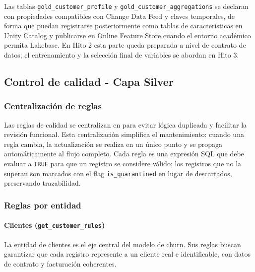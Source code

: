 \documentclass[12pt,a4paper]{article}
\begin{document}
Las tablas \texttt{gold\_customer\_profile} y \texttt{gold\_customer\_aggregations} se declaran con propiedades compatibles con Change Data Feed y claves temporales, de forma que puedan registrarse posteriormente como tablas de características en Unity Catalog y publicarse en Online Feature Store cuando el entorno académico permita Lakebase. En Hito 2 esta parte queda preparada a nivel de contrato de datos; el entrenamiento y la selección final de variables se abordan en Hito 3.

\subsection{Control de calidad - Capa Silver}

\subsubsection{Centralización de reglas}

Las reglas de calidad se centralizan en  para evitar lógica duplicada y facilitar la revisión funcional. Esta centralización simplifica el mantenimiento: cuando una regla cambia, la actualización se realiza en un único punto y se propaga automáticamente al flujo completo. Cada regla es una expresión SQL que debe evaluar a \texttt{TRUE} para que un registro se considere válido; los registros que no la superan son marcados con el flag \texttt{is\_quarantined} en lugar de descartados, preservando trazabilidad.

\subsubsection{Reglas por entidad}

\paragraph{Clientes (\texttt{get\_customer\_rules})}

La entidad de clientes es el eje central del modelo de churn. Sus reglas buscan garantizar que cada registro represente a un cliente real e identificable, con datos de contrato y facturación coherentes.
\end{document}
